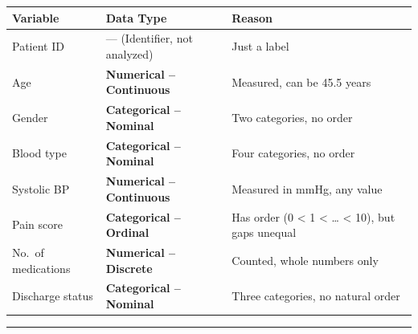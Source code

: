 \documentclass[
  12pt,
  letterpaper,
]{book}
\newcounter{none} %
\begin{document}
\begin{tcolorbox}[enhanced jigsaw, arc=.35mm, bottomrule=.15mm, bottomtitle=1mm, breakable, colback=white, colbacktitle=quarto-callout-tip-color!10!white, colframe=quarto-callout-tip-color-frame, coltitle=black, left=2mm, leftrule=.75mm, opacityback=0, opacitybacktitle=0.6, rightrule=.15mm, title={✅ Solution}, titlerule=0mm, toprule=.15mm, toptitle=1mm]

{\def\LTcaptype{none} %
\begin{longtable}[]{@{}
  >{\raggedright\arraybackslash}p{}
  >{\raggedright\arraybackslash}p{}
  >{\raggedright\arraybackslash}p{}@{}}
\toprule\noalign{}
\begin{minipage}[b]{\linewidth}\raggedright
Variable
\end{minipage} & \begin{minipage}[b]{\linewidth}\raggedright
Data Type
\end{minipage} & \begin{minipage}[b]{\linewidth}\raggedright
Reason
\end{minipage} \\
\midrule\noalign{}
\endhead
\bottomrule\noalign{}
\endlastfoot
Patient ID & --- (Identifier, not analyzed) & Just a label \\
Age & \textbf{Numerical -- Continuous} & Measured, can be 45.5 years \\
Gender & \textbf{Categorical -- Nominal} & Two categories, no order \\
Blood type & \textbf{Categorical -- Nominal} & Four categories, no
order \\
Systolic BP & \textbf{Numerical -- Continuous} & Measured in mmHg, any
value \\
Pain score & \textbf{Categorical -- Ordinal} & Has order (0 \textless{}
1 \textless{} \ldots{} \textless{} 10), but gaps unequal \\
No.~of medications & \textbf{Numerical -- Discrete} & Counted, whole
numbers only \\
Discharge status & \textbf{Categorical -- Nominal} & Three categories,
no natural order \\
\end{longtable}
}

\end{tcolorbox}

\begin{center}\rule{0.5\linewidth}{0.5pt}\end{center}
\end{document}
